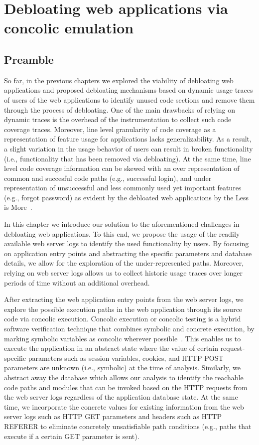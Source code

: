 \chapter{Debloating web applications via concolic emulation}
\label{chap:ad}
\section*{Preamble}

So far, in the previous chapters we explored the viability of debloating web applications and proposed debloating mechanisms based on dynamic usage traces of users of the web applications to identify unused code sections and remove them through the process of debloating. 
One of the main drawbacks of relying on dynamic traces is the overhead of the instrumentation to collect such code coverage traces. 
Moreover, line level granularity of code coverage as a representation of feature usage for applications lacks generalizability. 
As a result, a slight variation in the usage behavior of users can result in broken functionality (i.e., functionality that has been removed via debloating). 
At the same time, line level code coverage information can be skewed with an over representation of common and succesful code paths (e.g., successful login), and under representation of unsuccessful and less commonly used yet important features (e.g., forgot password) as evident by the debloated web applications by the Less is More~\cite{azad2019less}.

In this chapter we introduce our solution to the aforementioned challenges in debloating web applications. 
To this end, we propose the usage of the readily available web server logs to identify the used functionality by users. 
By focusing on application entry points and abstracting the specific parameters and database details, we allow for the exploration of the under-represented paths. 
Moreover, relying on web server logs allows us to collect historic usage traces over longer periods of time without an additional overhead.

After extracting the web application entry points from the web server logs, we explore the possible execution paths in the web application through its source code via concolic execution. 
Concolic execution or concolic testing is a hybrid software verification technique that combines symbolic and concrete execution, by marking symbolic variables as concolic wherever possible~\cite{sen2007concolic}.  
This enables us to execute the application in an abstract state where the value of certain request-specific parameters such as session variables, cookies, and HTTP POST parameters are unknown (i.e., symbolic) at the time of analysis. 
Similarly, we abstract away the database which allows our analysis to identify the reachable code paths and modules that can be invoked based on the HTTP requests from the web server logs regardless of the application database state. 
At the same time, we incorporate the concrete values for existing information from the web server logs such as HTTP GET parameters and headers such as HTTP REFERER to eliminate concretely unsatisfiable path conditions (e.g., paths that execute if a certain GET parameter is sent). 

